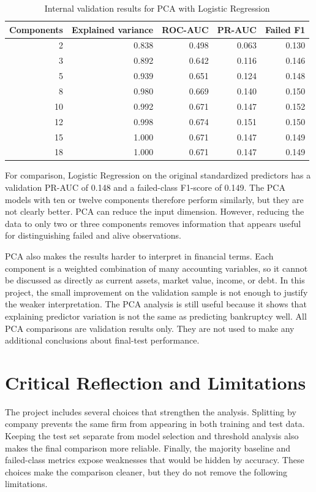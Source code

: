 \documentclass[11pt,a4paper]{article}
\begin{document}
\begin{table}[H]
  \centering
  \caption{Internal validation results for PCA with Logistic Regression}
  \label{tab:pca-results}
  \small
  \begin{tabular}{rrrrr}
    \toprule
    Components & Explained variance & ROC-AUC & PR-AUC & Failed F1 \\
    \midrule
    2  & 0.838 & 0.498 & 0.063 & 0.130 \\
    3  & 0.892 & 0.642 & 0.116 & 0.146 \\
    5  & 0.939 & 0.651 & 0.124 & 0.148 \\
    8  & 0.980 & 0.669 & 0.140 & 0.150 \\
    10 & 0.992 & 0.671 & 0.147 & 0.152 \\
    12 & 0.998 & 0.674 & 0.151 & 0.150 \\
    15 & 1.000 & 0.671 & 0.147 & 0.149 \\
    18 & 1.000 & 0.671 & 0.147 & 0.149 \\
    \bottomrule
  \end{tabular}
\end{table}

For comparison, Logistic Regression on the original standardized predictors
has a validation PR-AUC of 0.148 and a failed-class F1-score of 0.149. The PCA
models with ten or twelve components therefore perform similarly, but they are
not clearly better. PCA can reduce the input dimension. However, reducing the
data to only two or three components removes information that appears useful
for distinguishing failed and alive observations.

PCA also makes the results harder to interpret in financial terms. Each component is a weighted
combination of many accounting variables, so it cannot be discussed as
directly as current assets, market value, income, or debt. In this project, the
small improvement on the validation sample is not enough to justify the weaker
interpretation. The PCA analysis is still useful because it shows that
explaining predictor variation is not the same as predicting bankruptcy well.
All PCA comparisons are validation results only. They are not used to make any
additional conclusions about final-test performance.

\section{Critical Reflection and Limitations}
\label{sec:limitations}

The project includes several choices that strengthen the analysis. Splitting by
company prevents the same firm from appearing in both training and test data.
Keeping the test set separate from model selection and threshold analysis also
makes the final comparison more reliable. Finally, the majority baseline and
failed-class metrics expose weaknesses that would be hidden by accuracy. These
choices make the comparison cleaner, but they do not remove the following
limitations.
\end{document}
